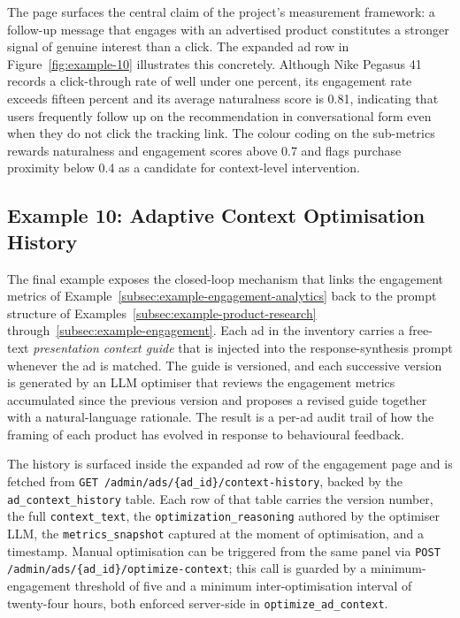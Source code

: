 The page surfaces the central claim of the project's measurement
framework: a follow-up message that engages with an advertised product
constitutes a stronger signal of genuine interest than a click. The
expanded ad row in Figure~\ref{fig:example-10} illustrates this concretely.
Although Nike Pegasus 41 records a click-through rate of well under one
percent, its engagement rate exceeds fifteen percent and its average
naturalness score is 0.81, indicating that users frequently follow up on
the recommendation in conversational form even when they do not click
the tracking link. The colour coding on the sub-metrics rewards
naturalness and engagement scores above 0.7 and flags purchase proximity
below 0.4 as a candidate for context-level intervention.


\subsection{Example 10: Adaptive Context Optimisation History}
\label{subsec:example-context-optimization}

The final example exposes the closed-loop mechanism that links the
engagement metrics of Example~\ref{subsec:example-engagement-analytics}
back to the prompt structure of Examples~\ref{subsec:example-product-research}
through~\ref{subsec:example-engagement}. Each ad in the inventory carries
a free-text \emph{presentation context guide} that is injected into the
response-synthesis prompt whenever the ad is matched. The guide is
versioned, and each successive version is generated by an LLM optimiser
that reviews the engagement metrics accumulated since the previous
version and proposes a revised guide together with a natural-language
rationale. The result is a per-ad audit trail of how the framing of each
product has evolved in response to behavioural feedback.

The history is surfaced inside the expanded ad row of the engagement
page and is fetched from \texttt{GET /admin/ads/\{ad\_id\}/context-history},
backed by the \texttt{ad\_context\_history} table. Each row of that table
carries the version number, the full \texttt{context\_text}, the
\texttt{optimization\_reasoning} authored by the optimiser LLM, the
\texttt{metrics\_snapshot} captured at the moment of optimisation, and a
timestamp. Manual optimisation can be triggered from the same panel via
\texttt{POST /admin/ads/\{ad\_id\}/optimize-context}; this call is
guarded by a minimum-engagement threshold of five and a minimum
inter-optimisation interval of twenty-four hours, both enforced server-side
in \texttt{optimize\_ad\_context}.

